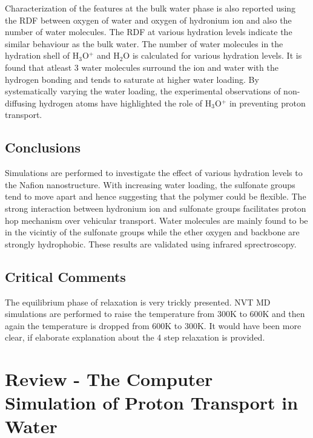 \documentclass{article}
\begin{document}
Characterization of the features at the bulk water phase is also reported using the RDF between oxygen of water and oxygen of hydronium ion and also the number of water molecules. The RDF at various hydration levels indicate the similar behaviour as the bulk water. The number of water molecules in the hydration shell of H$_{\text{3}}$O$^{\text{+}}$ and H$_{\text{2}}$O is calculated for various hydration levels. It is found that atleast 3 water molecules surround the ion and water with the hydrogen bonding and tends to saturate at higher water loading. By systematically varying the water loading, the experimental observations of non-diffusing hydrogen atoms have highlighted the role of H$_{\text{3}}$O$^{\text{+}}$ in preventing proton transport. 

\subsection{Conclusions}
\label{sec-1-4}
Simulations are performed to investigate the effect of various hydration levels to the Nafion nanostructure. With increasing water loading, the sulfonate groups tend to move apart and hence suggesting that the polymer could be flexible. The strong interaction between hydronium ion and sulfonate groups facilitates proton hop mechanism over vehicular transport. Water molecules are mainly found to be in the vicintiy of the sulfonate groups while the ether oxygen and backbone are strongly hydrophobic. These results are validated using infrared sprectroscopy.

\subsection{Critical Comments}
\label{sec-1-5}
The equilibrium phase of relaxation is very trickly presented. NVT MD simulations are performed to raise the temperature from 300K to 600K and then again the temperature is dropped from 600K to 300K. It would have been more clear, if elaborate explanation about the 4 step relaxation is provided.

\section{Review - The Computer Simulation of Proton Transport in Water \cite{schmitt1999}}
\label{sec-2}
\end{document}
